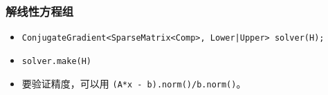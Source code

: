 \subsubsection{解线性方程组}
\begin{itemize}
\item \verb`ConjugateGradient<SparseMatrix<Comp>, Lower|Upper> solver(H);`
\item \verb`solver.make(H)`
\item 要验证精度，可以用 \verb`(A*x - b).norm()/b.norm()`。
\end{itemize}
